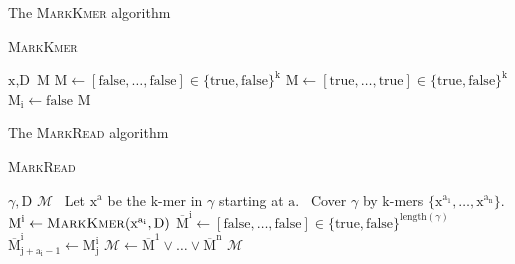 \documentclass[12pt]{beamer}
\begin{document}
    \begin{frame}{The \textsc{MarkKmer} algorithm}
        \begin{algorithm}[H]
	    \caption{\textsc{MarkKmer}}
	    \begin{algorithmic}[1]
		\REQUIRE \(\text{x}, \text{D}\)
		\ENSURE \(\text{M}\)
		    \STATE \(\text{M} \leftarrow [\text{false},\dots,\text{false}]\in\{\text{true},\text{false}\}^\text{k}\)
		\ELSE
		    \STATE \(\text{M} \leftarrow [\text{true},\dots,\text{true}]\in\{\text{true},\text{false}\}^\text{k}\)
			        \STATE \(\text{M}_\text{i}\leftarrow\text{false}\)
			    \ENDIF
			\ENDFOR
		    \ENDFOR
		\ENDIF
		\RETURN \(\text{M}\)
	    \end{algorithmic}
	\end{algorithm}
    \end{frame}

    \begin{frame}{The \textsc{MarkRead} algorithm}
        \begin{algorithm}[H]
	    \caption{\textsc{MarkRead}}
	    \begin{algorithmic}[1]
                \REQUIRE \(\gamma, \text{D}\)
                \ENSURE \(\mathcal{M}\)
		\STATE \, \COMMENT Let \(\text{x}^\text{a}\) be the \(\text{k}\)-mer in \(\gamma\) starting at \(\text{a}\).
                \STATE \, \COMMENT Cover \(\gamma\) by \(\text{k}\)-mers \(\{\text{x}^{\text{a}_\text{1}},\dots,\text{x}^{\text{a}_\text{n}}\}\).
		    \STATE \(\text{M}^\text{i} \leftarrow \text{\textsc{MarkKmer}}(\text{x}^{\text{a}_\text{i}},\text{D})\)
                    \STATE \(\overline{\text{M}}^\text{i} \leftarrow [\text{false},\dots,\text{false}]\in \{\text{true},\text{false}\}^{\text{length}(\gamma)}\)
		        \STATE \(\overline{\text{M}}^{\text{i}}_{\text{j}+\text{a}_\text{i}-1} \leftarrow \text{M}^\text{i}_\text{j}\)
		    \ENDFOR
                \ENDFOR
		\STATE \(\mathcal{M} \leftarrow \overline{\text{M}}^1 \lor \dots \lor \overline{\text{M}}^\text{n}\)
		\RETURN \(\mathcal{M}\)
	    \end{algorithmic}
	\end{algorithm}
    \end{frame}
\end{document}
